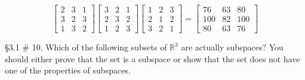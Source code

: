 \documentclass[]{exam}
\begin{document}
\begin{questions}
\begin{parts}
\begin{solution}
				\[
					\begin{bmatrix}
						2 & 3 & 1 \\
						3 & 2 & 3 \\
						1 & 3 & 2
					\end{bmatrix}
					\begin{bmatrix}
						3 & 2 & 1 \\
						2 & 3 & 2 \\
						1 & 2 & 3
					\end{bmatrix}
					\begin{bmatrix}
						1 & 2 & 3 \\
						2 & 1 & 2 \\
						3 & 2 & 1
					\end{bmatrix} =
					\begin{bmatrix}
						76 & 63 & 80 \\
						100 & 82 & 100 \\
						80 & 63 & 76
					\end{bmatrix}
				\]
			\end{solution}
		\end{parts}
		
		\newpage
		\question \S 3.1 \# 10. Which of the following subsets of $\mathbb{R}^3$ are actually subspaces? You should either prove that the set is a subspace or show that the set does not have one of the properties of subspaces.
	
	\begin{parts}

\end{parts}
\end{questions}
\end{document}
